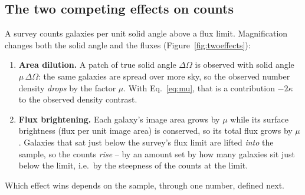 \documentclass[11pt]{article}
\begin{document}
\subsection{The two competing effects on counts}
\label{sec:twoeffects}

A survey counts galaxies per unit solid angle above a flux limit.
Magnification changes both the solid angle and the fluxes
(Figure~\ref{fig:twoeffects}):

\begin{enumerate}
\item \textbf{Area dilution.}  A patch of true solid angle
  $\Delta\Omega$ is observed with solid angle $\mu\,\Delta\Omega$:
  the same galaxies are spread over more sky, so the observed number
  density \emph{drops} by the factor $\mu$.  With
  Eq.~\eqref{eq:mu}, that is a contribution $-2\kappa$ to the
  observed density contrast.
\item \textbf{Flux brightening.}  Each galaxy's image area grows by
  $\mu$ while its surface brightness (flux per unit image area) is
  conserved, so its total flux grows by $\mu$.  Galaxies that sat
  just below the survey's flux limit are lifted \emph{into} the
  sample, so the counts \emph{rise} -- by an amount set by how many
  galaxies sit just below the limit, i.e.\ by the steepness of the
  counts at the limit.
\end{enumerate}

Which effect wins depends on the sample, through one number, defined
next.
\end{document}
